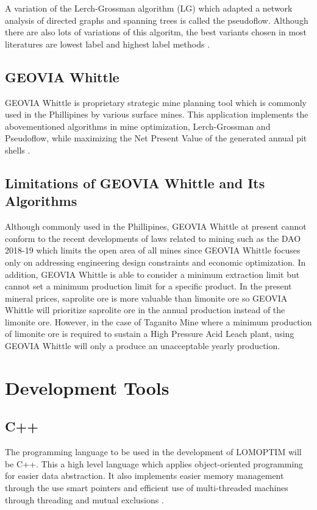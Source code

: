 \documentclass[12pt]{report}
\begin{document}
A variation of the Lerch-Grossman algorithm (LG) which adapted a network analysis of directed graphs and spanning trees is called the pseudoflow.
Although there are also lots of variations of this algoritm, the best variants chosen in most literatures are lowest label and highest label methods \cite{pseudoflow}.

\subsection{GEOVIA Whittle}

GEOVIA Whittle is proprietary strategic mine planning tool which is commonly used in the Phillipines by various surface mines.
This application implements the abovementioned algorithms in mine optimization, Lerch-Grossman and Pseudoflow, while maximizing the Net Present Value of the generated annual pit shells \cite{whittle}.

\subsection{Limitations of GEOVIA Whittle and Its Algorithms}

Although commonly used in the Phillipines, GEOVIA Whittle at present cannot conform to the recent developments of laws related to mining such as the DAO 2018-19 \cite{DAO2018-19} which limits the open area of all mines since GEOVIA Whittle focuses only on addressing engineering design constraints and economic optimization.
In addition, GEOVIA Whittle is able to consider a minimum extraction limit but cannot set a minimum production limit for a specific product.
In the present mineral prices, saprolite ore is more valuable than limonite ore so GEOVIA Whittle will prioritize saprolite ore in the annual production instead of the limonite ore.
However, in the case of Taganito Mine where a minimum production of limonite ore is required to sustain a High Pressure Acid Leach plant, using GEOVIA Whittle will only a produce an unacceptable yearly production.

\section{Development Tools}

\subsection{C++}

The programming language to be used in the development of LOMOPTIM will be C++.
This a high level language which applies object-oriented programming for easier data abstraction.
It also implements easier memory management through the use smart pointers and efficient use of multi-threaded machines through threading and mutual exclusions \cite{cpp}.
\end{document}
